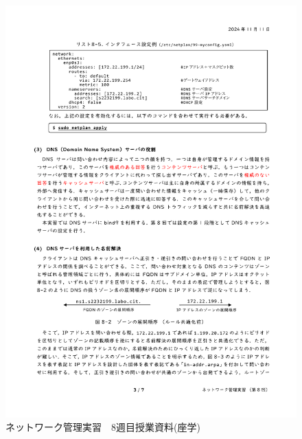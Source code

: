 \documentclass[12pt,a4j,titlepage]{ltjsarticle}
\begin{document}
\begin{figure}[!htb]
  \centering
  \includegraphics[width=12cm]{8週目1.pdf}
  \caption{ネットワーク管理実習　8週目授業資料(座学)}
  \label{fig:8no1}
\end{figure}
\end{document}
